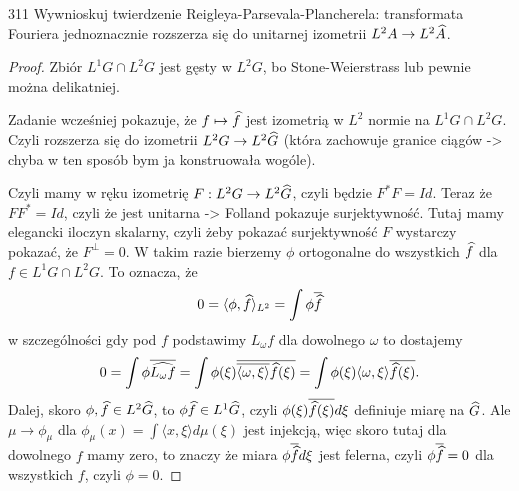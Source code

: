 \begin{zadanie}{3}{11}
  Wywnioskuj twierdzenie Reigleya-Parsevala-Plancherela: transformata Fouriera jednoznacznie rozszerza się do unitarnej izometrii $L^2A\to L^2\Hat{A}$.
\end{zadanie}

\begin{proof}
  Zbiór $L^1 G\cap L^2G$ jest gęsty w $L^2G$, bo Stone-Weierstrass lub pewnie można delikatniej. 

  Zadanie wcześniej pokazuje, że $f\mapsto \Hat{f}$ jest izometrią w $L^2$ normie na $L^1G\cap L^2 G$. Czyli rozszerza się do izometrii $L^2G\to L^2\Hat{G}$ (która zachowuje granice ciągów -> chyba w ten sposób bym ja konstruowała wogóle).

  Czyli mamy w ręku izometrię $F:L^2G\to L^2\Hat{G}$, czyli będzie $F^*F=Id$. Teraz że $FF^*=Id$, czyli że jest unitarna -> Folland pokazuje surjektywność. Tutaj mamy elegancki iloczyn skalarny, czyli żeby pokazać surjektywność $F$ wystarczy pokazać, że $F^\perp=0$. W takim razie bierzemy $\phi$ ortogonalne do wszystkich $\Hat{f}$ dla $f\in L^1G\cap L^2G$. To oznacza, że 
  $$0=\langle \phi, \Hat{f}\rangle_{L^2}=\int \phi\overline{\Hat{f}}$$
  w szczególności gdy pod $f$ podstawimy $L_\omega f$ dla dowolnego $\omega$ to dostajemy
  $$0=\int \phi\overline{\Hat{L_\omega f}}=\int \phi(\xi)\overline{\overline{\langle\omega, \xi\rangle}\Hat{f}(\xi)}=\int \phi(\xi)\langle \omega, \xi\rangle \overline{\Hat{f}(\xi)}.$$
  Dalej, skoro $\phi, \Hat{f}\in L^2\Hat{G}$, to $\phi\Hat{f}\in L^1\Hat{G}$, czyli $\phi(\xi)\overline{\Hat{f}(\xi)}d\xi$ definiuje miarę na $\Hat{G}$. Ale $\mu\to \phi_\mu$ dla $\phi_\mu(x)=\int \langle x, \xi\rangle d\mu(\xi)$ jest injekcją, więc skoro tutaj dla dowolnego $f$ mamy zero, to znaczy że miara $\phi\overline{\Hat{f}}d\xi$ jest felerna, czyli $\phi\overline{\Hat{f}}=0$ dla wszystkich $f$, czyli $\phi=0$.
\end{proof}


